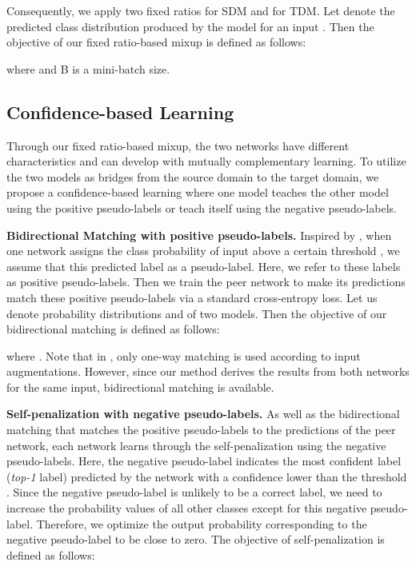 \documentclass[final]{cvpr}
\begin{document}
Consequently, we apply two fixed ratios  for SDM and  for TDM. Let  denote the predicted class distribution produced by the model for an input . Then the objective of our fixed ratio-based mixup is defined as follows:

where  and B is a mini-batch size.

\subsection{Confidence-based Learning}
Through our fixed ratio-based mixup, the two networks have different characteristics and can develop with mutually complementary learning. To utilize the two models as bridges from the source domain to the target domain, we propose a confidence-based learning where one model teaches the other model using the positive pseudo-labels or teach itself using the negative pseudo-labels.

\textbf{Bidirectional Matching with positive pseudo-labels.} 
Inspired by \cite{FixMatch, Co-teaching, Co-training}, when one network assigns the class probability of input above a certain threshold , we assume that this predicted label as a pseudo-label. Here, we refer to these labels as positive pseudo-labels. Then we train the peer network to make its predictions match these positive pseudo-labels via a standard cross-entropy loss. Let us denote probability distributions  and  of two models. Then the objective of our bidirectional matching is defined as follows:

where . Note that in \cite{FixMatch}, only one-way matching is used according to input augmentations. However, since our method derives the results from both networks for the same input, bidirectional matching is available.

\textbf{Self-penalization with negative pseudo-labels.} As well as the bidirectional matching that matches the positive pseudo-labels to the predictions of the peer network, each network learns through the self-penalization using the negative pseudo-labels.
Here, the negative pseudo-label indicates the most confident label (\emph{top-1} label) predicted by the network with a confidence lower than the threshold . Since the negative pseudo-label is unlikely to be a correct label, we need to increase the probability values of all other classes except for this negative pseudo-label. Therefore, we optimize the output probability corresponding to the negative pseudo-label to be close to zero. The objective of self-penalization is defined as follows:
\end{document}

